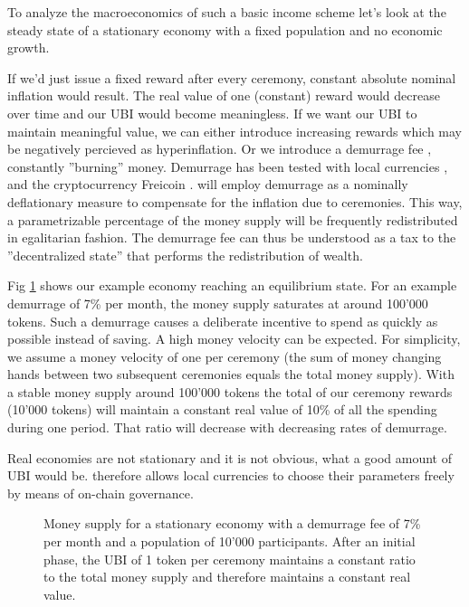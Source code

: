 \documentclass[conference]{IEEEtran}
\begin{document}
To analyze the macroeconomics of such a basic income scheme let's look at the steady state of a stationary economy with a fixed population and no economic growth. 

If we'd just issue a fixed reward after every ceremony, constant absolute nominal inflation would result. The real value of one (constant) reward would decrease over time and our UBI would become meaningless. If we want our UBI to maintain meaningful value, we can either introduce increasing rewards which may be negatively percieved as hyperinflation. Or we introduce a demurrage fee \cite{gesell}, constantly ''burning'' money. Demurrage has been tested with local currencies \cite{WIR}, \cite{Chiemgauer} and the cryptocurrency Freicoin \cite{freicoin}. \encointer will employ demurrage as a nominally deflationary measure to compensate for the inflation due to ceremonies. This way, a parametrizable percentage of the money supply will be frequently redistributed in egalitarian fashion. The demurrage fee can thus be understood as a tax to the ''decentralized state'' that performs the redistribution of wealth.

Fig \ref{fig:ubi-demurrage} shows our example economy reaching an equilibrium state. For an example demurrage of 7\% per month, the money supply saturates at around 100'000 tokens. Such a demurrage causes a deliberate incentive to spend as quickly as possible instead of saving. A high money velocity can be expected. For simplicity, we assume a money velocity of one per ceremony (the sum of money changing hands between two subsequent ceremonies equals the total money supply). With a stable money supply around 100'000 tokens the total of our ceremony rewards (10'000 tokens) will maintain a constant real value of 10\% of all the spending during one period. That ratio will decrease with decreasing rates of demurrage.

Real economies are not stationary and it is not obvious, what a good amount of UBI would be. \encointer therefore allows local currencies to choose their parameters freely by means of on-chain governance. 

\begin{figure}
	\centering
	\def\svgwidth{\columnwidth}
	
	\caption{Money supply for a stationary economy with a demurrage fee of 7\% per month and a population of 10'000 participants. After an initial phase, the UBI of 1 token per ceremony maintains a constant ratio to the total money supply and therefore maintains a constant real value.}
	\label{fig:ubi-demurrage}
\end{figure}
\end{document}
